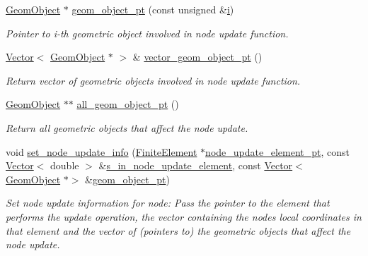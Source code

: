 \begin{DoxyCompactItemize}
\hyperlink{classoomph_1_1GeomObject}{Geom\+Object} $\ast$ \hyperlink{classoomph_1_1MacroElementNodeUpdateNode_a80abfe86ba00017a2c704ce354aaa4d2}{geom\+\_\+object\+\_\+pt} (const unsigned \&\hyperlink{cfortran_8h_adb50e893b86b3e55e751a42eab3cba82}{i})
\begin{DoxyCompactList}\small\item\em Pointer to i-\/th geometric object involved in node update function. \end{DoxyCompactList}\item 
\hyperlink{classoomph_1_1Vector}{Vector}$<$ \hyperlink{classoomph_1_1GeomObject}{Geom\+Object} $\ast$ $>$ \& \hyperlink{classoomph_1_1MacroElementNodeUpdateNode_adde92d8a65196b8cf3fcadde57c1f008}{vector\+\_\+geom\+\_\+object\+\_\+pt} ()
\begin{DoxyCompactList}\small\item\em Return vector of geometric objects involved in node update function. \end{DoxyCompactList}\item 
\hyperlink{classoomph_1_1GeomObject}{Geom\+Object} $\ast$$\ast$ \hyperlink{classoomph_1_1MacroElementNodeUpdateNode_a9664dec4bafcd4f27b2510c65389c1c2}{all\+\_\+geom\+\_\+object\+\_\+pt} ()
\begin{DoxyCompactList}\small\item\em Return all geometric objects that affect the node update. \end{DoxyCompactList}\item 
void \hyperlink{classoomph_1_1MacroElementNodeUpdateNode_ac7be9a6d6970ef6ca9d0406a117ddb13}{set\+\_\+node\+\_\+update\+\_\+info} (\hyperlink{classoomph_1_1FiniteElement}{Finite\+Element} $\ast$\hyperlink{classoomph_1_1MacroElementNodeUpdateNode_a42cf903a08c77142beb14087d768437d}{node\+\_\+update\+\_\+element\+\_\+pt}, const \hyperlink{classoomph_1_1Vector}{Vector}$<$ double $>$ \&\hyperlink{classoomph_1_1MacroElementNodeUpdateNode_a257cc8ea07e10ba7e21a04613bd37a39}{s\+\_\+in\+\_\+node\+\_\+update\+\_\+element}, const \hyperlink{classoomph_1_1Vector}{Vector}$<$ \hyperlink{classoomph_1_1GeomObject}{Geom\+Object} $\ast$$>$ \&\hyperlink{classoomph_1_1MacroElementNodeUpdateNode_a3874b8d7149e06c48faddd6f3ebee5ce}{geom\+\_\+object\+\_\+pt})
\begin{DoxyCompactList}\small\item\em Set node update information for node\+: Pass the pointer to the element that performs the update operation, the vector containing the node\textquotesingle{}s local coordinates in that element and the vector of (pointers to) the geometric objects that affect the node update. \end{DoxyCompactList}\end{DoxyCompactItemize}
